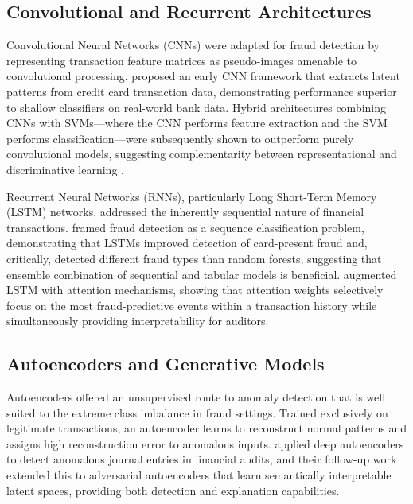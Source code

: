 \subsection{Convolutional and Recurrent Architectures}

Convolutional Neural Networks (CNNs) were adapted for fraud detection by representing
transaction feature matrices as pseudo-images amenable to convolutional processing.
\cite{fu2016credit} proposed an early CNN framework that extracts latent patterns from
credit card transaction data, demonstrating performance superior to shallow classifiers
on real-world bank data. Hybrid architectures combining CNNs with SVMs—where the CNN
performs feature extraction and the SVM performs classification—were subsequently shown
to outperform purely convolutional models, suggesting complementarity between
representational and discriminative learning \cite{berhane2023hybrid}.

Recurrent Neural Networks (RNNs), particularly Long Short-Term Memory (LSTM) networks,
addressed the inherently sequential nature of financial transactions. \cite{jurgovsky2018sequence}
framed fraud detection as a sequence classification problem, demonstrating that LSTMs
improved detection of card-present fraud and, critically, detected different fraud types
than random forests, suggesting that ensemble combination of sequential and tabular
models is beneficial. \cite{benchaji2021enhanced} augmented LSTM with attention
mechanisms, showing that attention weights selectively focus on the most fraud-predictive
events within a transaction history while simultaneously providing interpretability for
auditors.

\subsection{Autoencoders and Generative Models}

Autoencoders offered an unsupervised route to anomaly detection that is well suited to
the extreme class imbalance in fraud settings. Trained exclusively on legitimate
transactions, an autoencoder learns to reconstruct normal patterns and assigns high
reconstruction error to anomalous inputs. \cite{schreyer2017detection} applied deep
autoencoders to detect anomalous journal entries in financial audits, and their
follow-up work \cite{schreyer2019adversarial} extended this to adversarial autoencoders
that learn semantically interpretable latent spaces, providing both detection and
explanation capabilities.

